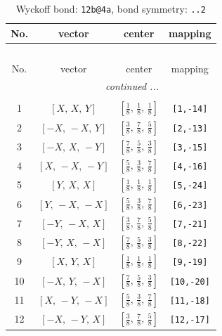 \documentclass[fleqn,8pt]{jsarticle}
\begin{document}
\begin{longtable}{cccc}
\caption{Wyckoff bond: {\tt 12b@4a}, bond symmetry: {\tt ..2}}
 \\
 \hline \hline
No. & vector & center & mapping \\ \hline \endfirsthead

\multicolumn{3}{l}{\tablename\ \thetable{}} \\
 \hline \hline
No. & vector & center & mapping \\ \hline \endhead

 \hline \hline
\multicolumn{3}{r}{\footnotesize\it continued ...} \\ \endfoot

 \hline \hline
\multicolumn{3}{r}{} \\ \endlastfoot

1 & $\left[ X,\, X,\, Y \right]$ & $\left[ \frac{1}{8},\, \frac{1}{8},\, \frac{1}{8} \right]$ & {\tt [1,-14]} \\ \hline
2 & $\left[ - X,\, - X,\, Y \right]$ & $\left[ \frac{3}{8},\, \frac{7}{8},\, \frac{5}{8} \right]$ & {\tt [2,-13]} \\ \hline
3 & $\left[ - X,\, X,\, - Y \right]$ & $\left[ \frac{7}{8},\, \frac{5}{8},\, \frac{3}{8} \right]$ & {\tt [3,-15]} \\ \hline
4 & $\left[ X,\, - X,\, - Y \right]$ & $\left[ \frac{5}{8},\, \frac{3}{8},\, \frac{7}{8} \right]$ & {\tt [4,-16]} \\ \hline
5 & $\left[ Y,\, X,\, X \right]$ & $\left[ \frac{1}{8},\, \frac{1}{8},\, \frac{1}{8} \right]$ & {\tt [5,-24]} \\ \hline
6 & $\left[ Y,\, - X,\, - X \right]$ & $\left[ \frac{5}{8},\, \frac{3}{8},\, \frac{7}{8} \right]$ & {\tt [6,-23]} \\ \hline
7 & $\left[ - Y,\, - X,\, X \right]$ & $\left[ \frac{3}{8},\, \frac{7}{8},\, \frac{5}{8} \right]$ & {\tt [7,-21]} \\ \hline
8 & $\left[ - Y,\, X,\, - X \right]$ & $\left[ \frac{7}{8},\, \frac{5}{8},\, \frac{3}{8} \right]$ & {\tt [8,-22]} \\ \hline
9 & $\left[ X,\, Y,\, X \right]$ & $\left[ \frac{1}{8},\, \frac{1}{8},\, \frac{1}{8} \right]$ & {\tt [9,-19]} \\ \hline
10 & $\left[ - X,\, Y,\, - X \right]$ & $\left[ \frac{7}{8},\, \frac{5}{8},\, \frac{3}{8} \right]$ & {\tt [10,-20]} \\ \hline
11 & $\left[ X,\, - Y,\, - X \right]$ & $\left[ \frac{5}{8},\, \frac{3}{8},\, \frac{7}{8} \right]$ & {\tt [11,-18]} \\ \hline
12 & $\left[ - X,\, - Y,\, X \right]$ & $\left[ \frac{3}{8},\, \frac{7}{8},\, \frac{5}{8} \right]$ & {\tt [12,-17]} \\
\end{longtable}
\end{document}
